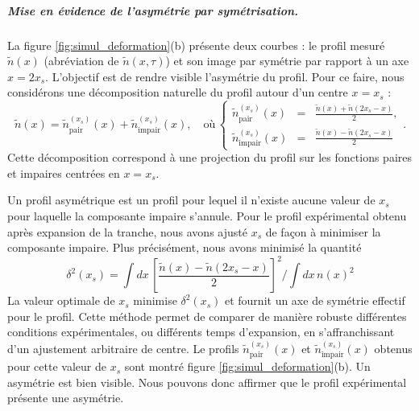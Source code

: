 \subparagraph{Mise en évidence de l’asymétrie par symétrisation.}
La figure \ref{fig:simul_deformation}(b) présente deux courbes : le profil mesuré $\tilde{n}(x)$ (abréviation de $\tilde{n}(x,\tau)$) et son image par symétrie par rapport à un axe $x = 2x_s$. L’objectif est de rendre visible l’asymétrie du profil.
Pour ce faire, nous considérons une décomposition naturelle du profil autour d’un centre $x = x_s$ :
\begin{equation}
\tilde{n}(x) = \tilde{n}_{\text{pair}}^{(x_s)}(x) + \tilde{n}_{\text{impair}}^{(x_s)}(x),\quad \mbox{où} \, \left\{\begin{array}{lcr}\tilde{n}_{\text{pair}}^{(x_s)}(x) &=&  \displaystyle \frac{\tilde{n}(x) + \tilde{n}(2x_s - x)}{2} , \\ \tilde{n}_{\text{impair}}^{(x_s)}(x) &=& \displaystyle \frac{\tilde{n}(x) - \tilde{n}(2x_s - x) }{2}\end{array} \right. .
\end{equation}
Cette décomposition correspond à une projection du profil sur les fonctions paires et impaires centrées en $x = x_s$.

\medskip



Un profil asymétrique est un profil pour lequel il n'existe aucune valeur de $x_s$ pour laquelle la composante impaire s'annule. Pour le profil expérimental obtenu après expansion de la tranche, nous avons ajusté $x_s$ de façon à minimiser la composante impaire. Plus précisément, nous avons minimisé la quantité
\begin{equation}
\mathcal{\delta}^2(x_s) = \int dx\, \left[\frac{\tilde{n}(x) - \tilde{n}(2x_s - x)}{2}\right]^2 \Big / \int dx \,  n(x)^2
\end{equation}
La valeur optimale de $x_s$ minimise $\mathcal{\delta}^2(x_s)$ et fournit un axe de symétrie effectif pour le profil. Cette méthode permet de comparer de manière robuste différentes conditions expérimentales, ou différents temps d’expansion, en s’affranchissant d’un ajustement arbitraire de centre.
Le profils $\tilde{n}_{\text{pair}}^{(x_s)}(x)$ et $\tilde{n}_{\text{impair}}^{(x_s)}(x)$ obtenus pour cette valeur de $x_s$ sont montré figure \ref{fig:simul_deformation}(b). Un asymétrie est bien visible. Nous pouvons donc affirmer que le profil expérimental présente une asymétrie. 


